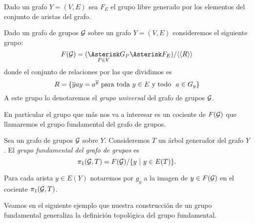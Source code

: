 \documentclass[tesis.tex]{subfiles}
\begin{document}
Dado un grafo $Y = (V, E)$ sea $F_{E}$ el grupo libre generado por los elementos del conjunto de aristas del grafo.

\begin{deff}
	Dado un grafo de grupos $\cal G$ sobre un grafo $Y = (V, E)$ consideremos el siguiente grupo: 
	\begin{equation*}
		F({\cal G}) = (\underset{P \in V}{\Asterisk} G_P \Asterisk F_{E}) / \langle \langle  R \rangle \rangle
	\end{equation*}
	donde el conjunto de relaciones por las que dividimos es 
	\[
		R = \{  \overline y a y = a^{\overline y}   \ \text{para toda $y \in E$ y todo \  $a \in G_y$} \}
	\]
	A este grupo lo denotaremos el \emph{grupo universal} del grafo de grupos ${\cal G}$.
\end{deff}

En particular el grupo que más nos va a interesar es un cociente de $F({\cal G})$ que llamaremos el grupo fundamental del grafo de grupos.

\begin{deff} \label{def_pi1_arbol}
	Sea un grafo de grupos $\cal G$ sobre $Y$.
	Consideremos $T$ un árbol generador del grafo $Y$.
	El \emph{grupo fundamental del grafo de grupos} es
	\begin{equation*}
		\pi_1({\cal G}, T) = F({\cal G}) / \{ y \  | \ y \in E(T)  \}.
	\end{equation*}
\end{deff}

\begin{obs}
	Para cada arista $y \in E(Y)$ notaremos por $g_{y}$ a la imagen de $y \in F({\cal G})$ en el cociente $\pi_1({\cal G},T)$.
\end{obs}

Veamos en el siguiente ejemplo que nuestra construcción de un grupo fundamental generaliza la definición topológica del grupo fundamental.
\end{document}
